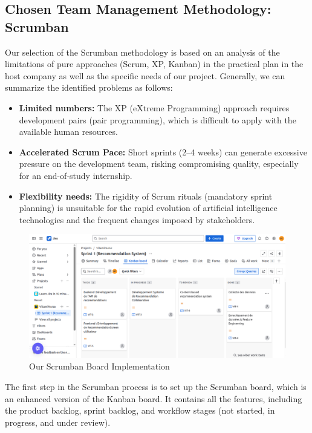 \subsection{Chosen Team Management Methodology: Scrumban}
Our selection of the Scrumban methodology is based on an analysis of the limitations of pure approaches (Scrum, XP, Kanban) in the practical plan in the host company as well as the specific needs of our project. Generally, we can summarize the identified problems as follows:
\begin{itemize}
    \item \textbf{Limited numbers:}
    The XP (eXtreme Programming) approach requires development pairs (pair programming), which is difficult to apply with the available human resources.
        
    \item \textbf{Accelerated Scrum Pace:}
    Short sprints (2–4 weeks) can generate excessive pressure on the development team, risking compromising quality, especially for an end-of-study internship.    
        
    \item \textbf{Flexibility needs:}
    The rigidity of Scrum rituals (mandatory sprint planning) is unsuitable for the rapid evolution of artificial intelligence technologies and the frequent changes imposed by stakeholders.
    \end{itemize}
    
\begin{center}
\begin{figure}[H]
            \centering
            \includegraphics[scale=0.38]{images/kanbanBoard.png}
            \caption{Our Scrumban Board Implementation}
            \label{fig:Tableau_Scrumban}
\end{figure}
\end{center}

The first step in the Scrumban process is to set up the Scrumban board, which is an enhanced version of the Kanban board. It contains all the features, including the product backlog, sprint backlog, and workflow stages (not started, in progress, and under review).

